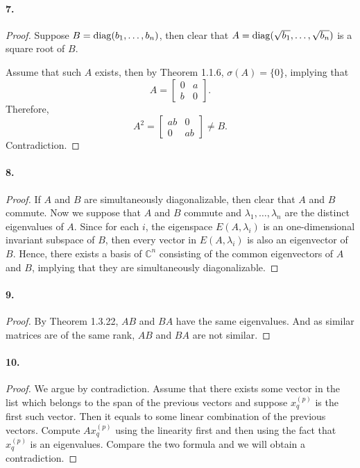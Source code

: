   \paragraph{7.}
  \begin{proof}
    Suppose $B=\operatorname{diag}(b_1,\dots,b_n)$, then clear that $A=\operatorname{diag}(\sqrt{b_1},\dots,
    \sqrt{b_n})$ is a square root of $B$.\par
    Assume that such $A$ exists, then by Theorem 1.1.6, $\sigma(A)=\{0\}$, 
    implying that 
    \[
      A = \begin{bmatrix}
        0 & a \\ b & 0        
      \end{bmatrix}.
    \]
    Therefore,
    \[
      A^2 = \begin{bmatrix}
        ab & 0 \\ 0 & ab
      \end{bmatrix} \ne B.
    \]
    Contradiction.
  \end{proof}

  \paragraph{8.}
  \begin{proof}
    If $A$ and $B$ are simultaneously diagonalizable, then clear that $A$ and 
    $B$ commute. Now we suppose that $A$ and $B$ commute and $\lambda_1,\dots,
    \lambda_n$ are the distinct eigenvalues of $A$. Since for each $i$, the 
    eigenspace $E(A,\lambda_i)$ is an one-dimensional invariant subspace of $B$,
    then every vector in $E(A,\lambda_i)$ is also an eigenvector of $B$. Hence, 
    there exists a basis of $\mathbb{C}^n$ consisting of the common eigenvectors
    of $A$ and $B$, implying that they are simultaneously diagonalizable.
  \end{proof}

  \paragraph{9.}
  \begin{proof}
    By Theorem 1.3.22, $AB$ and $BA$ have the same eigenvalues. And as similar
    matrices are of the same rank, $AB$ and $BA$ are not similar.
  \end{proof}

  \paragraph{10.}
  \begin{proof}
    We argue by contradiction. Assume that there exists some vector in the list
    which belongs to the span of the previous vectors and suppose $x^{(p)}_q$ is
    the first such vector. Then it equals to some linear combination of the 
    previous vectors. Compute $Ax^{(p)}_q$ using the linearity first and then 
    using the fact that $x^{(p)}_q$ is an eigenvalues. Compare the two formula
    and we will obtain a contradiction.
  \end{proof}


